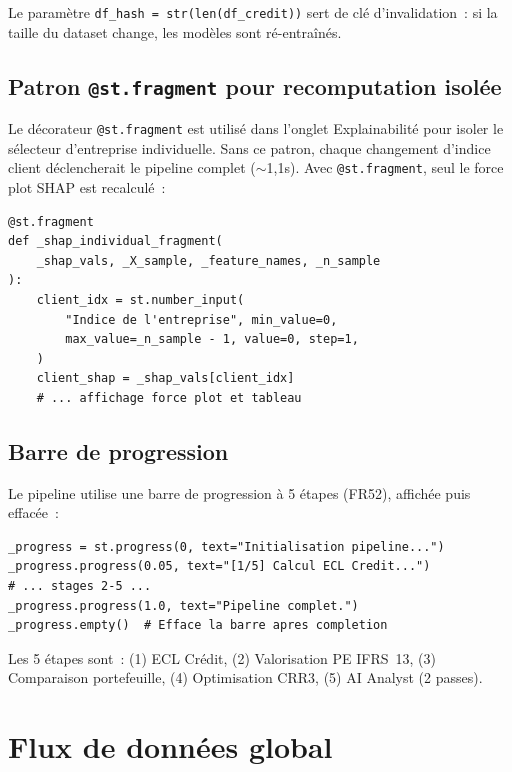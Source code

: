 \documentclass[12pt,a4paper]{article}
\begin{document}
Le param\`etre \texttt{df\_hash = str(len(df\_credit))} sert de cl\'e d'invalidation~: si la taille du dataset change, les mod\`eles sont r\'e-entra\^{i}n\'es.

\subsection{Patron \texttt{@st.fragment} pour recomputation isol\'ee}

Le d\'ecorateur \texttt{@st.fragment} est utilis\'e dans l'onglet \og Explainabilit\'e \fg{} pour isoler le s\'electeur d'entreprise individuelle. Sans ce patron, chaque changement d'indice client d\'eclencherait le pipeline complet ($\sim$1,1s). Avec \texttt{@st.fragment}, seul le force plot SHAP est recalcul\'e~:

\begin{lstlisting}
@st.fragment
def _shap_individual_fragment(
    _shap_vals, _X_sample, _feature_names, _n_sample
):
    client_idx = st.number_input(
        "Indice de l'entreprise", min_value=0,
        max_value=_n_sample - 1, value=0, step=1,
    )
    client_shap = _shap_vals[client_idx]
    # ... affichage force plot et tableau
\end{lstlisting}

\subsection{Barre de progression}

Le pipeline utilise une barre de progression \`a 5 \'etapes (FR52), affich\'ee puis effac\'ee~:

\begin{lstlisting}
_progress = st.progress(0, text="Initialisation pipeline...")
_progress.progress(0.05, text="[1/5] Calcul ECL Credit...")
# ... stages 2-5 ...
_progress.progress(1.0, text="Pipeline complet.")
_progress.empty()  # Efface la barre apres completion
\end{lstlisting}

Les 5 \'etapes sont~: (1) ECL Cr\'edit, (2) Valorisation PE IFRS~13, (3) Comparaison portefeuille, (4) Optimisation CRR3, (5) AI Analyst (2 passes).


\section{Flux de donn\'ees global}
\label{sec:dataflow}
\end{document}
